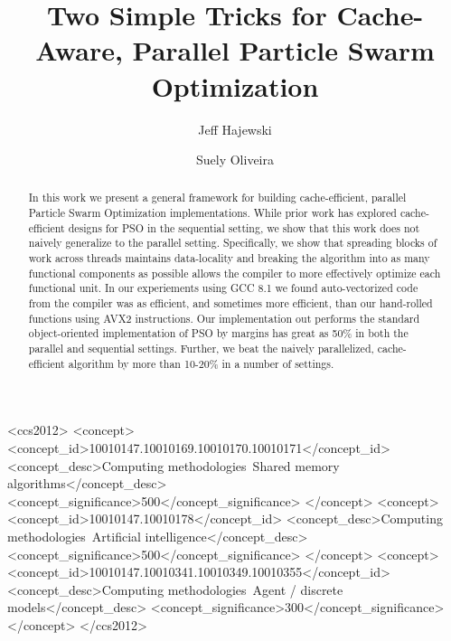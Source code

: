 \documentclass[sigconf]{acmart}
\begin{document}
\title{Two Simple Tricks for Cache-Aware, Parallel Particle Swarm Optimization}
\author{Jeff Hajewski}

\author{Suely Oliveira}

\renewcommand{\shortauthors}{J. Hajewski et al.}


\begin{abstract}
  In this work we present a general framework for building cache-efficient,
  parallel Particle Swarm Optimization implementations.  While prior work
  \cite{cache-pso} has explored cache-efficient designs for PSO in the
  sequential setting, we show that this work does not naively generalize to the
  parallel setting.  Specifically, we show that spreading blocks of work across
  threads maintains data-locality and breaking the algorithm into as many
  functional components as possible allows the compiler to more effectively
  optimize each functional unit.  In our experiements using GCC 8.1
  we found auto-vectorized code from the compiler was as efficient, and
  sometimes more efficient, than our hand-rolled functions using AVX2
  instructions.  Our implementation out performs the standard object-oriented
  implementation of PSO by margins has great as 50\% in both the parallel and
  sequential settings. Further, we beat the naively parallelized,
  cache-efficient algorithm by more than 10-20\% in a number of settings.
\end{abstract}

%
%
\begin{CCSXML}
<ccs2012>
<concept>
<concept_id>10010147.10010169.10010170.10010171</concept_id>
<concept_desc>Computing methodologies~Shared memory algorithms</concept_desc>
<concept_significance>500</concept_significance>
</concept>
<concept>
<concept_id>10010147.10010178</concept_id>
<concept_desc>Computing methodologies~Artificial intelligence</concept_desc>
<concept_significance>500</concept_significance>
</concept>
<concept>
<concept_id>10010147.10010341.10010349.10010355</concept_id>
<concept_desc>Computing methodologies~Agent / discrete models</concept_desc>
<concept_significance>300</concept_significance>
</concept>
</ccs2012>
\end{CCSXML}
\end{document}
